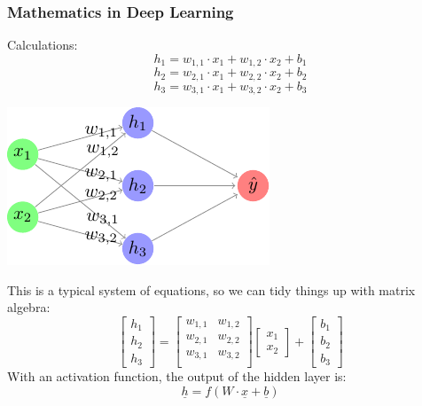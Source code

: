 \documentclass{beamer}
\begin{document}
\begin{frame}
    \frametitle{Mathematics in Deep Learning}
    \begin{minipage}{0.45\textwidth}
        Calculations:
        \[h_{1} = w_{1, 1} \cdot x_1 + w_{1, 2} \cdot x_2 + b_{1}\]
        \[h_{2} = w_{2, 1} \cdot x_1 + w_{2, 2} \cdot x_2 + b_{2}\]
        \[h_{3} = w_{3, 1} \cdot x_1 + w_{3, 2} \cdot x_2 + b_{3}\]
    \end{minipage}
    \hfill
    \begin{minipage}{0.45\textwidth}
        \includegraphics{figures/basic-mlp-weights/main.pdf}
    \end{minipage} \pause
    \vspace{0.5cm}

    This is a typical system of equations, so we can tidy things up with matrix algebra: \pause
    \[
        \begin{bmatrix}
            h_{1} \\
            h_{2} \\
            h_{3}
        \end{bmatrix}
        =
        \begin{bmatrix}
            w_{1, 1} & w_{1, 2} \\
            w_{2, 1} & w_{2, 2} \\
            w_{3, 1} & w_{3, 2} \\
        \end{bmatrix}
        \begin{bmatrix}
            x_1 \\
            x_2
        \end{bmatrix}
        +
        \begin{bmatrix}
            b_1 \\
            b_2 \\
            b_3
        \end{bmatrix}
    \] \pause
    With an activation function, the output of the hidden layer is:
    \[\underline{h} = f(W \cdot \underline{x} + \underline{b})\]
\end{frame}
\end{document}
